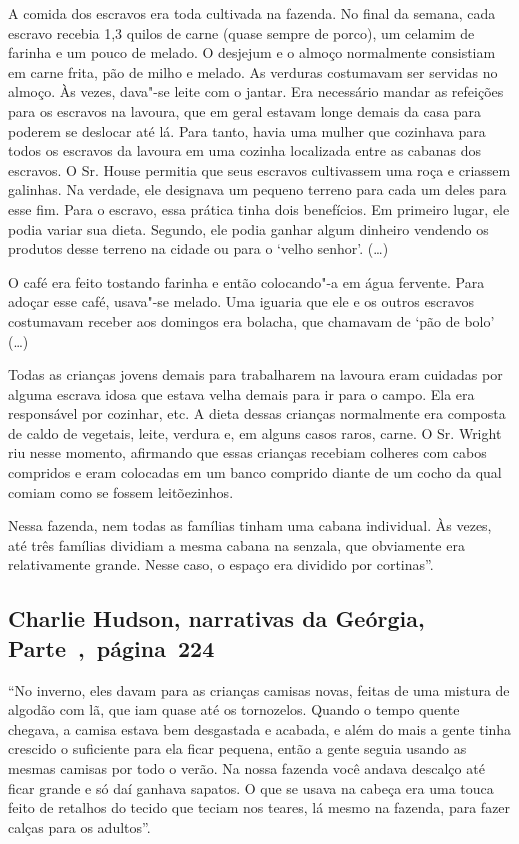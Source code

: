A comida dos escravos era toda cultivada na fazenda. No final da semana,
cada escravo recebia 1,3 quilos de carne (quase sempre de porco), um celamim
de farinha e um pouco de melado. O desjejum e o almoço normalmente
consistiam em carne frita, pão de milho e melado. As verduras costumavam
ser servidas no almoço. Às vezes, dava"-se leite com o jantar. Era
necessário mandar as refeições para os escravos na lavoura, que em geral
estavam longe demais da casa para poderem se deslocar até lá. Para
tanto, havia uma mulher que cozinhava para todos os escravos da lavoura
em uma cozinha localizada entre as cabanas dos escravos. O Sr. House
permitia que seus escravos cultivassem uma roça e criassem galinhas. Na
verdade, ele designava um pequeno terreno para cada um deles para esse
fim. Para o escravo, essa prática tinha dois benefícios. Em primeiro
lugar, ele podia variar sua dieta. Segundo, ele podia ganhar algum
dinheiro vendendo os produtos desse terreno na cidade ou para o `velho
senhor'. (\ldots{})

O café era feito tostando farinha e então colocando"-a em água fervente.
Para adoçar esse café, usava"-se melado. Uma iguaria que ele e os outros
escravos costumavam receber aos domingos era bolacha, que chamavam de
`pão de bolo' (\ldots{})

Todas as crianças jovens demais para trabalharem na lavoura eram
cuidadas por alguma escrava idosa que estava velha demais para ir para o
campo. Ela era responsável por cozinhar, etc. A dieta dessas crianças
normalmente era composta de caldo de vegetais, leite, verdura e, em
alguns casos raros, carne. O Sr. Wright riu nesse momento, afirmando que
essas crianças recebiam colheres com cabos compridos e eram colocadas em
um banco comprido diante de um cocho da qual comiam como se fossem
leitõezinhos.

Nessa fazenda, nem todas as famílias tinham uma cabana individual. Às
vezes, até três famílias dividiam a mesma cabana na senzala, que
obviamente era relativamente grande. Nesse caso, o espaço era dividido
por cortinas''.

\subsection{Charlie Hudson, narrativas da Geórgia, Parte~,~página~224}
\label{ref149}

``No inverno, eles davam para as crianças camisas novas, feitas de uma
mistura de algodão com lã, que iam quase até os tornozelos. Quando o
tempo quente chegava, a camisa estava bem desgastada e acabada, e além
do mais a gente tinha crescido o suficiente para ela ficar pequena,
então a gente seguia usando as mesmas camisas por todo o verão. Na nossa
fazenda você andava descalço até ficar grande e só daí ganhava sapatos.
O que se usava na cabeça era uma touca feito de retalhos do tecido que
teciam nos teares, lá mesmo na fazenda, para fazer calças para os
adultos''.

